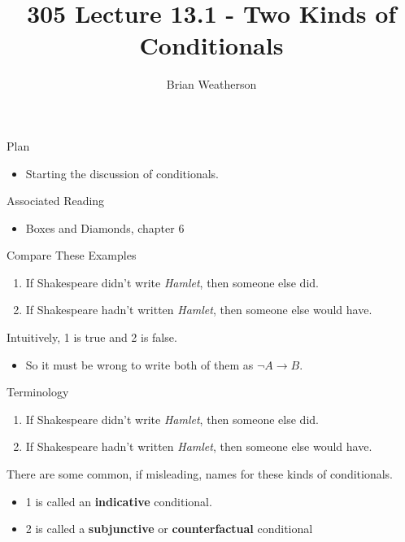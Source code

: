 \documentclass[
  ignorenonframetext,
]{beamer}
\title{305 Lecture 13.1 - Two Kinds of Conditionals}
\author{Brian Weatherson}
\date{}
\providecommand{\tightlist}{%
  \setlength{\itemsep}{0pt}\setlength{\parskip}{0pt}}
\renewcommand{\,}{\text{, }}
\begin{document}
\frame{\titlepage}

\begin{frame}{Plan}
\protect\hypertarget{plan}{}
\begin{itemize}
\tightlist
\item
  Starting the discussion of conditionals.
\end{itemize}
\end{frame}

\begin{frame}{Associated Reading}
\protect\hypertarget{associated-reading}{}
\begin{itemize}
\tightlist
\item
  Boxes and Diamonds, chapter 6
\end{itemize}
\end{frame}

\begin{frame}{Compare These Examples}
\protect\hypertarget{compare-these-examples}{}
\begin{enumerate}
\tightlist
\item
  If Shakespeare didn't write \emph{Hamlet}, then someone else did.
\item
  If Shakespeare hadn't written \emph{Hamlet}, then someone else would
  have. \pause 
\end{enumerate}

Intuitively, 1 is true and 2 is false. \pause 

\begin{itemize}
\tightlist
\item
  So it must be wrong to write both of them as \(\neg A \rightarrow B\).
\end{itemize}
\end{frame}

\begin{frame}{Terminology}
\protect\hypertarget{terminology}{}
\begin{enumerate}
\tightlist
\item
  If Shakespeare didn't write \emph{Hamlet}, then someone else did.
\item
  If Shakespeare hadn't written \emph{Hamlet}, then someone else would
  have.
\end{enumerate}

There are some common, if misleading, names for these kinds of
conditionals.

\begin{itemize}
\tightlist
\item
  1 is called an \textbf{indicative} conditional.
\item
  2 is called a \textbf{subjunctive} or \textbf{counterfactual}
  conditional
\end{itemize}
\end{frame}
\end{document}
